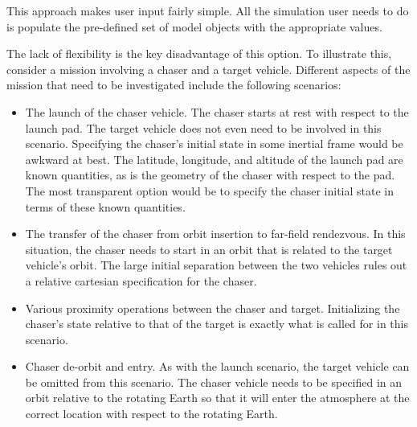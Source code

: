 This approach makes user input fairly simple. All
the simulation user needs to do is populate the pre-defined set of
model objects with the appropriate values.

The lack of flexibility is the key disadvantage of this option.
To illustrate this, consider a mission involving a chaser and a target vehicle.
Different aspects of the mission that need to be investigated
include the following scenarios:
\begin{itemize}
\item The launch of the chaser vehicle. The chaser starts at rest with respect
to the launch pad. The target vehicle does not even need to
be involved in this scenario.
Specifying the chaser's initial state in some inertial
frame would be awkward at best.
The latitude, longitude, and altitude of the launch pad are known
quantities, as is the geometry of the chaser with respect to the pad.
The most transparent option would be to specify the chaser initial state
in terms of these known quantities.
\item The transfer of the chaser from orbit insertion to far-field rendezvous.
In this situation, the chaser needs to start in an orbit that is related
to the target vehicle's orbit. The large initial separation between the
two vehicles rules out a relative cartesian specification for the chaser.
\item Various proximity operations between the chaser and target.
Initializing the chaser's state relative to that
of the target is exactly what is called for in this scenario.
\item Chaser de-orbit and entry.
As with the launch scenario, the target vehicle can be omitted
from this scenario. The chaser vehicle needs to be specified in an orbit
relative to the rotating Earth so that it will enter the atmosphere at the
correct location with respect to the rotating Earth.
\end{itemize}


